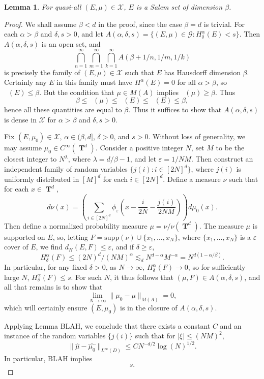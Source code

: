 \documentclass[12pt,reqno]{article}
\DeclareMathOperator{\hausdim}{\dim_{\mathbf{H}}}
\DeclareMathOperator{\fordim}{\dim_{\mathbf{F}}}
\DeclareMathOperator{\TT}{\mathbf{T}}
\newtheorem{lemma}[theorem]{Lemma}
\begin{document}
\begin{lemma}
    For quasi-all $(E,\mu) \in \mathcal{X}$, $E$ is a Salem set of dimension $\beta$.
\end{lemma}
\begin{proof}
    We shall assume $\beta < d$ in the proof, since the case $\beta = d$ is trivial. For each $\alpha > \beta$ and $\delta, s > 0$, and let $A(\alpha,\delta,s) = \{ (E,\mu) \in \mathcal{G}: H^\alpha_\delta(E) < s \}$. Then $A(\alpha,\delta,s)$ is an open set, and
    \[ \bigcap_{n = 1}^\infty \bigcap_{m = 1}^\infty \bigcap_{k = 1}^\infty A(\beta + 1/n, 1/m, 1/k) \]
    is precisely the family of $(E,\mu) \in \mathcal{X}$ such that $E$ has Hausdorff dimension $\beta$. Certainly any $E$ in this family must have $H^\alpha(E) = 0$ for all $\alpha > \beta$, so $\hausdim(E) \leq \beta$. But the condition that $\mu \in M(A)$ implies $\fordim(\mu) \geq \beta$. Thus
    \[ \beta \leq \fordim(\mu) \leq \fordim(E) \leq \hausdim(E) \leq \beta, \]
    hence all these quantities are equal to $\beta$. Thus it suffices to show that $A(\alpha,\delta,s)$ is dense in $\mathcal{X}$ for $\alpha > \beta$ and $\delta, s > 0$.

    Fix $(E,\mu_0) \in \mathcal{X}$, $\alpha \in (\beta,d]$, $\delta > 0$, and $s > 0$. Without loss of generality, we may assume $\mu_0 \in C^\infty(\TT^d)$. Consider a positive integer $N$, set $M$ to be the closest integer to $N^\lambda$, where $\lambda = d/\beta - 1$, and let $\varepsilon = 1/NM$. Then construct an independent family of random variables $\{ j(i) : i \in [2N]^d \}$, where $j(i)$ is uniformly distributed in $[M]^d$ for each $i \in [2N]^d$. Define a measure $\nu$ such that for each $x \in \TT^d$,
    \[ d\nu(x) = \left( \sum_{i \in [2N]^d} \phi_\varepsilon \left( x - \frac{i}{2N} - \frac{j(i)}{2NM} \right) \right) d\mu_0(x). \]
    Then define a normalized probability measure $\mu = \nu / \nu(\TT^d)$. The measure $\mu$ is supported on $E$, so, letting $F = \text{supp}(\nu) \cup \{ x_1, \dots, x_N \}$, where $\{ x_1, \dots, x_N \}$ is a $\varepsilon$ cover of $E$, we find $d_H(E,F) \leq \varepsilon$, and if $\delta \geq \varepsilon$,
    \[ H^\alpha_\delta(F) \leq (2N)^d / (NM)^\alpha \lesssim_d N^{d-\alpha} M^{-\alpha} = N^{d(1 - \alpha/\beta)}. \]
    In particular, for any fixed $\delta > 0$, as $N \to \infty$, $H^\alpha_\delta(F) \to 0$, so for sufficiently large $N$, $H^\alpha_\delta(F) \leq s$. For such $N$, it thus follows that $(\mu,F) \in A(\alpha,\delta,s)$, and all that remains is to show that
    \[ \lim_{N \to \infty} \| \mu_0 - \mu \|_{M(A)} = 0, \]
    which will certainly ensure $(E,\mu_0)$ is in the closure of $A(\alpha,\delta,s)$.

    Applying Lemma BLAH, we conclude that there exists a constant $C$ and an instance of the random variables $\{ j(i) \}$ such that for $|\xi| \leq (NM)^2$,
    \[ \| \widehat{\mu} - \widehat{\mu_0} \|_{L^\infty(D)} \leq C N^{-d/2} \log(N)^{1/2}. \]
    In particular, BLAH implies
    \[ s. \]
\end{proof}
\end{document}
